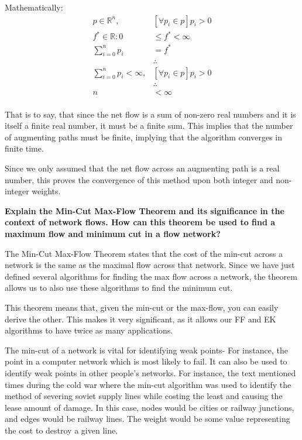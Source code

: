 \documentclass[12pt]{amsart}
\begin{document}
    Mathematically:
    \[
    \begin{aligned}
        p \in \mathbb{R}^n , &\left[ \forall p_i \in p \right]
            p_i > 0 \\
        f^* \in \mathbb{R}: 0 &\le f^* < \infty \\
        \sum_{i = 0}^n { p_i } &= f^* \\
        &\therefore \\
        \sum_{i = 0}^n p_i < \infty , &\left[ \forall p_i \in p
            \right] p_i > 0 \\
        &\therefore \\
        n &< \infty \\
    \end{aligned}
    \]

    That is to say, that since the net flow is a sum of non-zero
    real numbers and it is itself a finite real number, it must
    be a finite sum. This implies that the number of augmenting
    paths must be finite, implying that the algorithm converges
    in finite time.

    Since we only assumed that the net flow across an augmenting
    path is a real number, this proves the convergence of this
    method upon both integer and non-integer weights.

    \textbf{Explain the Min-Cut Max-Flow Theorem and its
    significance in the context of network flows. How can this
    theorem be used to find a maximum flow and minimum cut in a
    flow network?}

    The Min-Cut Max-Flow Theorem states that the cost of the
    min-cut across a network is the same as the maximal flow
    across that network. Since we have just defined several
    algorithms for finding the max flow across a network, the
    theorem allows us to also use these algorithms to find the
    minimum cut.

    This theorem means that, given the min-cut or the max-flow,
    you can easily derive the other. This makes it very
    significant, as it allows our FF and EK algorithms to have
    twice as many applications.

    The min-cut of a network is vital for identifying weak
    points- For instance, the point in a computer network which
    is most likely to fail. It can also be used to identify weak
    points in other people's networks. For instance, the text
    mentioned times during the cold war where the min-cut
    algorithm was used to identify the method of severing soviet
    supply lines while costing the least and causing the lease
    amount of damage. In this case, nodes would be cities or
    railway junctions, and edges would be railway lines. The
    weight would be some value representing the cost to destroy
    a given line.
\end{document}
